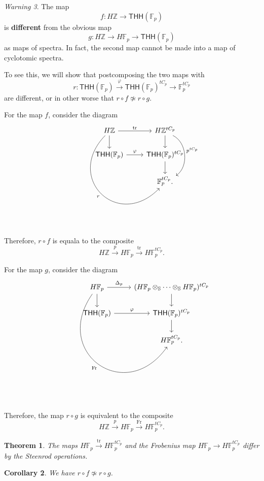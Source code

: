 \documentclass[10pt, oneside]{memoir}
\newtheorem{thm}{Theorem}[subsection]
\newtheorem{cor}[thm]{Corollary}
\theoremstyle{definition}
\theoremstyle{remark}
\newtheorem{warn}[thm]{Warning}
\theoremstyle{plain}
\theoremstyle{definition}
\theoremstyle{remark}
\newcommand{\Z}{\mathbb{Z}}
\newcommand{\F}{\mathbb{F}}
\newcommand{\bS}{\mathbb{S}}
\newcommand{\mr}[1]{\mathrm{#1}}
\newcommand{\on}[1]{\operatorname{#1}}
\newcommand{\ms}[1]{\mathsf{#1}}
\newcommand{\1}{\mathbf{1}}
\newcommand{\2}{\mathbf{2}}
\newcommand{\3}{\mathbf{3}}
\newcommand{\THH}{\ms{THH}}
\begin{document}
\begin{warn}
    The map
    \[ f \colon H\Z \to \THH(\F_p) \]
    is \textbf{different} from the obvious map
    \[ g \colon H\Z \to H\F_p \to \THH(\F_p) \]
    as maps of spectra. In fact, the second map cannot be made into a map of cyclotomic spectra.

    To see this, we will show that postcomposing the two maps with
    \[ r \colon \THH(\F_p) \xrightarrow{\varphi} \THH(\F_p)^{t C_p} \to \F_p^{t C_p} \]
    are different, or in other worse that $r \circ f \not\simeq r \circ g$.

    For the map $f$, consider the diagram
    \begin{equation*}
    \begin{tikzcd}
        H\Z \ar{r}{\on{tr}} \ar{d} \ar[bend right = 90, looseness=2]{ddr}[swap]{r} & H\Z^{t C_p} \ar{d} \ar[bend left=60]{dd}{p^{tC_p}} \\
        \THH(\F_p) \ar{r}{\varphi} & \THH(\F_p)^{tC_p} \ar{d} \\
        & \F_p^{t C_p}.
    \end{tikzcd}
    \end{equation*}
    Therefore, $r \circ f$ is equala to the composite
    \[ H\Z \xrightarrow{p} H\F_p \xrightarrow{\mr{tr}} H\F_p^{t C_p}. \]

    For the map $g$, consider the diagram
    \begin{equation*}
    \begin{tikzcd}
        H\F_p \ar{d} \ar{r}{\Delta_p} \ar[bend right=90,looseness=2]{ddr}[swap]{\mr{Fr}} & (H\F_p \otimes_{\bS} \cdots \otimes_{\bS} H\F_p)^{t C_p} \ar{d} \\
        \THH(\F_p) \ar{r}{\varphi} & \THH(\F_p)^{t C_p} \ar{d} \\
        & H \F_p^{t C_p}.
    \end{tikzcd}
    \end{equation*}
    Therefore, the map $r \circ g$ is equivalent to the composite
    \[ H\Z \xrightarrow{p} H \F_p \xrightarrow{\mr{Fr}} H\F_p^{t C_p}. \]

    \begin{thm}
        The maps $H \F_p \xrightarrow{\mr{tr}} H\F_p^{t C_p}$ and the Frobenius map $H \F_p \to H\F_p^{t C_p}$ differ by the Steenrod operations.
    \end{thm}

    \begin{cor}
        We have $r \circ f \not\simeq r \circ g$.
    \end{cor}
\end{warn}
\end{document}
